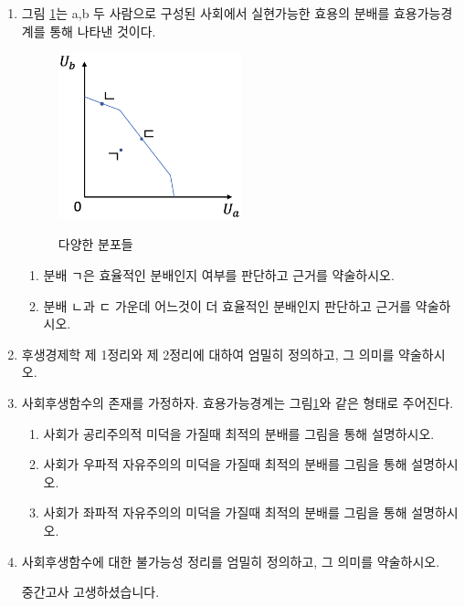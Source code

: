 \documentclass{article}
\begin{document}
\begin{enumerate}[{\bf 문제 \arabic*.}]
    \item 그림 \ref{pe}는 a,b 두 사람으로 구성된 사회에서 실현가능한 효용의 분배를 효용가능경계를 통해 나타낸 것이다.
        \begin{figure}[htbp]
            \centering
            \caption{다양한 분포들}
            \includegraphics[width=0.5\textwidth]{pic/ParetoE.png}
            \label{pe}
        \end{figure}
        \begin{enumerate}
            \item 분배 ㄱ은 효율적인 분배인지 여부를 판단하고 근거를 약술하시오.
            \item 분배 ㄴ과 ㄷ 가운데 어느것이 더 효율적인 분배인지 판단하고 근거를 약술하시오.
        \end{enumerate}
    

    \item 후생경제학 제 1정리와 제 2정리에 대하여 엄밀히 정의하고, 그 의미를 약술하시오.
    
    \item 사회후생함수의 존재를 가정하자. 효용가능경계는 그림\ref{pe}와 같은 형태로 주어진다.
        \begin{enumerate}
            \item 사회가 공리주의적 미덕을 가질때 최적의 분배를 그림을 통해 설명하시오.
            \item 사회가 우파적 자유주의의 미덕을 가질때 최적의 분배를 그림을 통해 설명하시오.
            \item 사회가 좌파적 자유주의의 미덕을 가질때 최적의 분배를 그림을 통해 설명하시오.
        \end{enumerate}
        
    \item 사회후생함수에 대한 불가능성 정리를 엄밀히 정의하고, 그 의미를 약술하시오.

\vspace{3cm}

    \centering
    \large{중간고사 고생하셨습니다.}
  
\end{enumerate}



\end{document}
